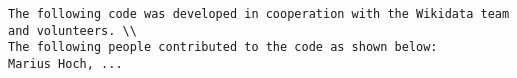 \begin{lstlisting}[frame=single]
The following code was developed in cooperation with the Wikidata team and volunteers. \\
The following people contributed to the code as shown below:
Marius Hoch, ...
\end{lstlisting}